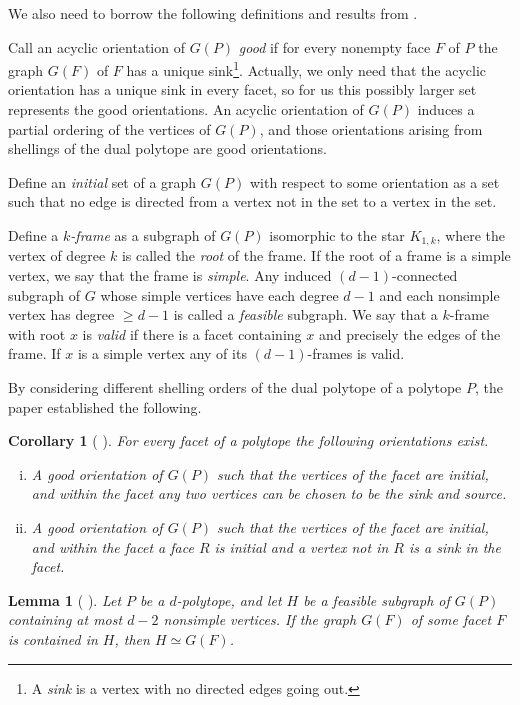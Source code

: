 \documentclass[a4paper]{amsart}
\newtheorem{corollary}[theorem]{Corollary}
\newtheorem{lemma}[theorem]{Lemma}
\theoremstyle{definition}
\theoremstyle{remark}
\begin{document}
We also need to borrow the following definitions and results from \cite{NevPinUgo17}.

Call an acyclic orientation  of $G(P)$ {\it good } if for every nonempty face $F$ of $P$ the graph $G(F)$ of $F$ has a unique sink\footnote{ A {\it sink} is a vertex with no directed edges going out.}. Actually, we only need that the acyclic orientation has a unique sink in every facet, so for us this possibly larger set represents the good orientations. An acyclic orientation of $G(P)$  induces a partial ordering of the vertices  of $G(P)$, and those orientations arising from shellings of the dual polytope are good orientations.

Define an {\it initial} set of a graph $G(P)$ with respect to some orientation as a set such that no edge is directed from a vertex not in the set to a vertex in the set.

Define a {\it $k$-frame} as a subgraph of $G(P)$ isomorphic to the star $K_{1,k}$, where the vertex of degree $k$ is called the {\it root} of the frame. If the root of a frame is a simple vertex, we say that the frame is {\it simple}. Any induced $(d-1)$-connected subgraph of $G$ whose simple vertices have each degree $d-1$ and each nonsimple vertex has degree $\ge d-1$ is called a {\it feasible}  subgraph. We say that a $k$-frame with root $x$ is {\it valid} if there is a facet containing $x$ and precisely the edges of the frame. If $x$ is a simple vertex any of its $(d-1)$-frames is valid.

By considering different shelling orders of the dual polytope of a polytope $P$, the paper \cite{NevPinUgo17} established the following.  
\begin{corollary}[{ \cite[Cor.~4.3]{NevPinUgo17}}] \label{cor:Orientation-F-Initial}For every facet of a polytope the following orientations exist.
\begin{enumerate}[(i)]
\item A good orientation of $G(P)$ such that the vertices of the facet are initial, and within the facet any two vertices can be chosen to be the sink and source.

\item A good orientation of $G(P)$ such that the vertices of the facet are initial, and within the facet a face $R$ is initial and a vertex not in $R$ is a sink in the facet.
\end{enumerate}
\end{corollary}

\begin{lemma}[{ \cite[Cor.~4.4]{NevPinUgo17}}] \label{lem:feasible-subgraphs}  Let $P$ be a $d$-polytope, and let $H$ be a feasible subgraph of $G(P)$ containing at most $d-2$ nonsimple vertices. If the graph $G(F)$ of some facet $F$ is contained in $H$, then $H\simeq G(F)$.
\end{lemma}
\end{document}
